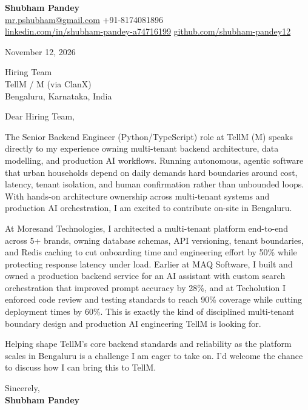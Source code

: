 \documentclass[a4paper,11pt]{article}
\begin{document}
\textbf{\Large Shubham Pandey}\\
\href{mailto:mr.pshubham@gmail.com}{mr.pshubham@gmail.com} \quad +91-8174081896\\
\href{https://www.linkedin.com/in/shubham-pandey-a74716199/}{linkedin.com/in/shubham-pandey-a74716199} \quad
\href{https://github.com/shubham-pandey12}{github.com/shubham-pandey12}

\vspace{1em}
November 12, 2026

\vspace{1em}
Hiring Team\\
TellM / M (via ClanX)\\
Bengaluru, Karnataka, India

\vspace{1em}
Dear Hiring Team,

The Senior Backend Engineer (Python/TypeScript) role at TellM (M) speaks directly to my experience owning multi-tenant backend architecture, data modelling, and production AI workflows. Running autonomous, agentic software that urban households depend on daily demands hard boundaries around cost, latency, tenant isolation, and human confirmation rather than unbounded loops. With hands-on architecture ownership across multi-tenant systems and production AI orchestration, I am excited to contribute on-site in Bengaluru.

At Moresand Technologies, I architected a multi-tenant platform end-to-end across 5+ brands, owning database schemas, API versioning, tenant boundaries, and Redis caching to cut onboarding time and engineering effort by 50\% while protecting response latency under load. Earlier at MAQ Software, I built and owned a production backend service for an AI assistant with custom search orchestration that improved prompt accuracy by 28\%, and at Techolution I enforced code review and testing standards to reach 90\% coverage while cutting deployment times by 60\%. This is exactly the kind of disciplined multi-tenant boundary design and production AI engineering TellM is looking for.

Helping shape TellM's core backend standards and reliability as the platform scales in Bengaluru is a challenge I am eager to take on. I'd welcome the chance to discuss how I can bring this to TellM.

\vspace{1em}
Sincerely,\\[0.5em]
\textbf{Shubham Pandey}
\end{document}
